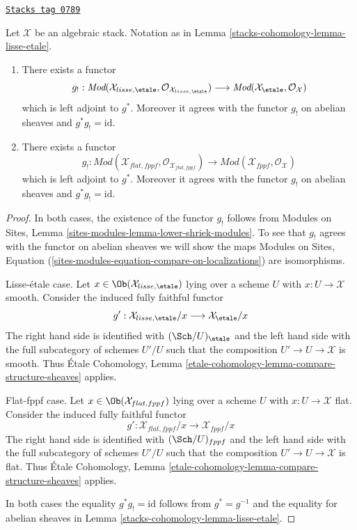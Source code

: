 \begin{lemma}
\label{stacks-cohomology-lemma-lisse-etale-modules}
\href{https://stacks.math.columbia.edu/tag/0789}{\texttt{Stacks tag 0789}}

Let $\mathcal{X}$ be an algebraic stack. Notation as in
Lemma \ref{stacks-cohomology-lemma-lisse-etale}.
\begin{enumerate}
\item There exists a functor
$$
g_! :
\textit{Mod}(\mathcal{X}_{lisse,\etale},
\mathcal{O}_{\mathcal{X}_{lisse,\etale}})
\longrightarrow
\textit{Mod}(\mathcal{X}_\etale, \mathcal{O}_{\mathcal{X}})
$$
which is left adjoint to $g^*$. Moreover it agrees with the functor $g_!$
on abelian sheaves and $g^*g_! = \text{id}$.
\item There exists a functor
$$
g_! :
\textit{Mod}(\mathcal{X}_{flat,fppf},
\mathcal{O}_{\mathcal{X}_{flat,fppf}})
\longrightarrow
\textit{Mod}(\mathcal{X}_{fppf}, \mathcal{O}_{\mathcal{X}})
$$
which is left adjoint to $g^*$. Moreover it agrees with the functor $g_!$
on abelian sheaves and $g^*g_! = \text{id}$.
\end{enumerate}
\end{lemma}

\begin{proof}
In both cases, the existence of the functor $g_!$ follows from
Modules on Sites, Lemma \ref{sites-modules-lemma-lower-shriek-modules}.
To see that $g_!$ agrees with the functor on abelian sheaves we will
show the maps Modules on Sites, Equation
(\ref{sites-modules-equation-compare-on-localizations})
are isomorphisms.

\medskip\noindent
Lisse-\'etale case. Let $x \in \Ob(\mathcal{X}_{lisse,\etale})$
lying over a scheme $U$ with $x : U \to \mathcal{X}$ smooth.
Consider the induced fully faithful functor
$$
g' :
\mathcal{X}_{lisse,\etale}/x
\longrightarrow
\mathcal{X}_\etale/x
$$
The right hand side is identified with $(\Sch/U)_\etale$ and the
left hand side with the full subcategory of schemes $U'/U$ such that
the composition $U' \to U \to \mathcal{X}$ is smooth. Thus
\'Etale Cohomology, Lemma
\ref{etale-cohomology-lemma-compare-structure-sheaves}
applies.

\medskip\noindent
Flat-fppf case. Let $x \in \Ob(\mathcal{X}_{flat,fppf})$
lying over a scheme $U$ with $x : U \to \mathcal{X}$ flat.
Consider the induced fully faithful functor
$$
g' :
\mathcal{X}_{flat,fppf}/x
\longrightarrow
\mathcal{X}_{fppf}/x
$$
The right hand side is identified with $(\Sch/U)_{fppf}$ and the
left hand side with the full subcategory of schemes $U'/U$ such that
the composition $U' \to U \to \mathcal{X}$ is flat. Thus
\'Etale Cohomology, Lemma
\ref{etale-cohomology-lemma-compare-structure-sheaves}
applies.

\medskip\noindent
In both cases the equality $g^*g_! = \text{id}$ follows from
$g^* = g^{-1}$ and the
equality for abelian sheaves in Lemma \ref{stacks-cohomology-lemma-lisse-etale}.
\end{proof}

